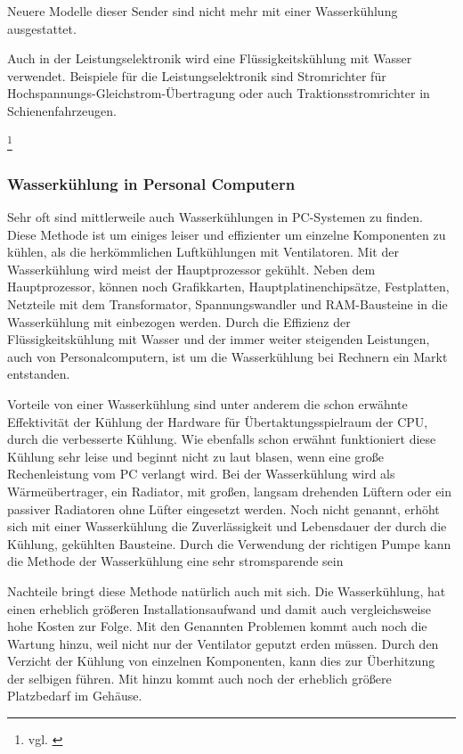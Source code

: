 Neuere Modelle dieser Sender sind nicht mehr mit einer Wasserkühlung ausgestattet.

Auch in der Leistungselektronik wird eine Flüssigkeitskühlung mit Wasser verwendet. Beispiele für die Leistungselektronik sind Stromrichter für Hochspannungs-Gleichstrom-Übertragung oder auch 
Traktionsstromrichter in Schienenfahrzeugen.

\footnote{vgl. \cite{Wasserkuehlung}}
\newpage

\subsubsection{Wasserkühlung in Personal Computern}

Sehr oft sind mittlerweile auch Wasserkühlungen in PC-Systemen zu finden. Diese Methode ist um einiges leiser und effizienter um einzelne Komponenten zu kühlen, als die herkömmlichen Luftkühlungen mit Ventilatoren. Mit der Wasserkühlung wird meist der Hauptprozessor gekühlt. Neben dem Hauptprozessor, können noch Grafikkarten, Hauptplatinenchipsätze, Festplatten, Netzteile mit dem Transformator, Spannungswandler und RAM-Bausteine in die Wasserkühlung mit einbezogen werden.
Durch die Effizienz der Flüssigkeitskühlung mit Wasser und der immer weiter steigenden Leistungen, auch von Personalcomputern, ist um die Wasserkühlung bei Rechnern ein Markt entstanden.

Vorteile von einer Wasserkühlung sind unter anderem die schon erwähnte Effektivität der Kühlung der Hardware für Übertaktungsspielraum der CPU, durch die verbesserte Kühlung. Wie ebenfalls schon erwähnt funktioniert diese Kühlung sehr leise und beginnt nicht zu laut blasen, wenn eine große Rechenleistung vom PC verlangt wird. Bei der Wasserkühlung wird als Wärmeübertrager, ein Radiator, mit großen, langsam drehenden Lüftern oder ein passiver Radiatoren ohne Lüfter eingesetzt werden.
Noch nicht genannt, erhöht sich mit einer Wasserkühlung die Zuverlässigkeit und Lebensdauer der durch die Kühlung, gekühlten Bausteine. Durch die Verwendung der richtigen Pumpe kann die Methode der Wasserkühlung eine sehr stromsparende sein

Nachteile bringt diese Methode natürlich auch mit sich. Die Wasserkühlung, hat einen erheblich größeren Installationsaufwand und damit auch vergleichsweise hohe Kosten zur Folge. Mit den Genannten Problemen kommt auch noch die Wartung hinzu, weil nicht nur der Ventilator geputzt erden müssen.  Durch den Verzicht der Kühlung von einzelnen Komponenten, kann dies zur Überhitzung der selbigen führen. Mit hinzu kommt auch noch der erheblich größere Platzbedarf im Gehäuse. 

